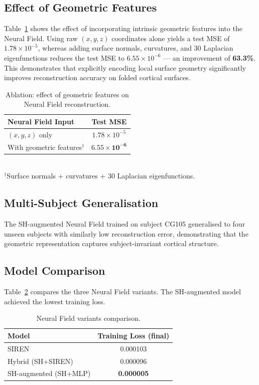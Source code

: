 \documentclass[twocolumn]{article}
\begin{document}
	\subsection{Effect of Geometric Features}
	Table~\ref{tab:ablation} shows the effect of incorporating intrinsic geometric features into the Neural Field. Using raw $(\textit{x}, \textit{y}, \textit{z})$ coordinates alone yields a test MSE of $1.78 \times 10^{-5}$, whereas adding surface normals, curvatures, and 30 Laplacian eigenfunctions reduces the test MSE to $6.55 \times 10^{-6}$ --- an improvement of \textbf{63.3\%}. This demonstrates that explicitly encoding local surface geometry significantly improves reconstruction accuracy on folded cortical surfaces.
	
	\begin{table}[htbp]
		\centering
		\small
		\caption{Ablation: effect of geometric features on Neural Field reconstruction.}
		\label{tab:ablation}
		\begin{tabular}{l c}
			\toprule
			\textbf{Neural Field Input} & \textbf{Test MSE} \\
			\midrule
			$(x, y, z)$ only & $1.78 \times 10^{-5}$ \\
			With geometric features$^\dagger$ & $\mathbf{6.55 \times 10^{-6}}$ \\
			\bottomrule
		\end{tabular}
		\\[2pt]
		\footnotesize $^\dagger$Surface normals + curvatures + 30 Laplacian eigenfunctions.
	\end{table}
	
	\subsection{Multi-Subject Generalisation}
	The SH-augmented Neural Field trained on subject CG105 generalised to four unseen subjects with similarly low reconstruction error, demonstrating that the geometric representation captures subject-invariant cortical structure.
	
	\subsection{Model Comparison}
	Table~\ref{tab:models} compares the three Neural Field variants. The SH-augmented model achieved the lowest training loss.
	
	\begin{table}[htbp]
		\centering
		\caption{Neural Field variants comparison.}
		\label{tab:models}
		\begin{tabular}{l c}
			\toprule
			\textbf{Model} & \textbf{Training Loss (final)} \\
			\midrule
			SIREN & 0.000103 \\
			Hybrid (SH+SIREN) & 0.000096 \\
			SH-augmented (SH+MLP) & \textbf{0.000005} \\
			\bottomrule
		\end{tabular}
	\end{table}
	
\end{document}
